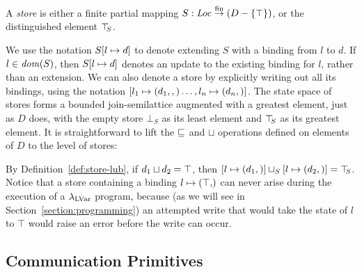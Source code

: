 \begin{definition}\label{def:store}
A \emph{store} is either a finite partial mapping $S : \mathit{Loc} \stackrel{\textrm{fin}}{\rightarrow}
(D-\lbrace \top \rbrace)$, or the distinguished element $\top\hspace{-0.85mm}_{S}$.
\end{definition}

We use the notation $S[l \mapsto d]$ to denote extending $S$ with a
binding from $l$ to $d$.  If $l \in \mathit{dom}(S)$, then $S[l \mapsto d]$
denotes an update to the existing binding for $l$, rather than an
extension.  We can also denote a store by explicitly writing out all
its bindings, using the notation $\left[ l_1 \mapsto (d_1, ,)
  \dots, l_n \mapsto (d_n, \right)]$.  The state space of stores forms a
bounded join-semilattice augmented with a greatest element, just as
$D$ does, with the empty store $\bot_S$ as its least element and
$\top\hspace{-0.85mm}_{S}$ as its greatest element.  It is straightforward to lift the
$\sqsubseteq$ and $\sqcup$ operations defined on elements of $D$ to the
level of stores:

\DefLeqStore

\DefLubStore

By Definition~\ref{def:store-lub}, if $d_1 \sqcup d_2 = \top$,
then
$\left[ l \mapsto (d_1, \right)] \sqcup_{S} \left[ l \mapsto (d_2, \right)]
= \top\hspace{-0.85mm}_{S}$.  Notice that a store containing a binding
$\storebinding{l}{\top}$ can never arise during the execution of a
$\lambda_{\textrm{LVar}}$ program, because (as we will see in
Section~\ref{section:programming}) an attempted write that would take
the state of $l$ to $\top$ would raise an error before the write can
occur.

\subsection{Communication Primitives}\label{subsection:putget}


